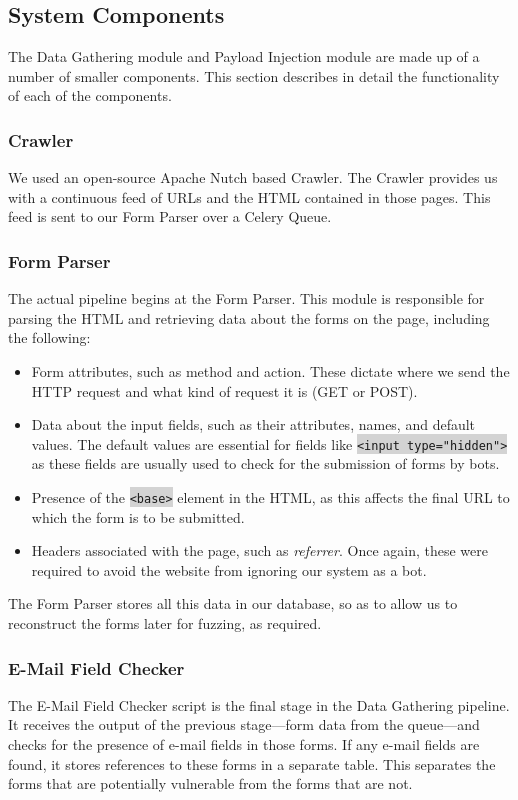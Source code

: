 \subsection{System Components}
\label{Comp}

The Data Gathering module and Payload Injection module are made up of a number of smaller components. This section describes in detail the functionality of each of the components.

\subsubsection{Crawler}
\label{Comp:Crawler}
We used an open-source Apache Nutch based Crawler. The Crawler provides us with a continuous feed of URLs and the HTML contained in those pages. This feed is sent to our Form Parser over a Celery Queue.

\subsubsection{Form Parser}
\label{Comp:FP}
The actual pipeline begins at the Form Parser. This module is responsible for parsing the HTML and retrieving data about the forms on the page, including the following:
\begin{itemize}
	\item Form attributes, such as method and action. These dictate where we send the HTTP request and what kind of request it is (GET or POST).
	\item Data about the input fields, such as their attributes, names, and default values. The default values are essential for fields like \colorbox{lightgray}{\lstinline{<input type="hidden">}} as these fields are usually used to check for the submission of forms by bots.
	\item Presence of the \colorbox{lightgray}{\lstinline{<base>}} element in the HTML, as this affects the final URL to which the form is to be submitted.
	\item Headers associated with the page, such as \emph{referrer}. Once again, these were required to avoid the website from ignoring our system as a bot.
\end{itemize} 
The Form Parser stores all this data in our database, so as to allow us to reconstruct the forms later for fuzzing, as required.

\subsubsection{E-Mail Field Checker}
\label{Comp:EMFC}
The E-Mail Field Checker script is the final stage in the Data Gathering pipeline. It receives the output of the previous stage---form data from the queue---and checks for the presence of e-mail fields in those forms. If any e-mail fields are found, it stores references to these forms in a separate table. This separates the forms that are potentially vulnerable from the forms that are not.

